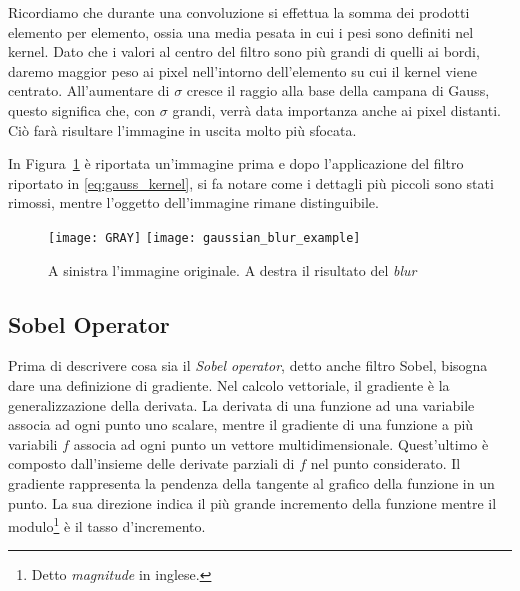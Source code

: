 Ricordiamo che durante una convoluzione si effettua la somma dei prodotti elemento per elemento, ossia una media pesata in cui i pesi sono definiti nel kernel.
Dato che i valori al centro del filtro sono più grandi di quelli ai bordi, daremo maggior peso ai pixel nell'intorno dell'elemento su cui il kernel viene centrato.
All'aumentare di $\sigma$ cresce il raggio alla base della campana di Gauss, questo significa che, con $\sigma$ grandi, verrà data importanza anche ai pixel distanti.
Ciò farà risultare l'immagine in uscita molto più sfocata.

In Figura~\ref{fig:gaussian_blur_example} è riportata un'immagine prima e dopo l'applicazione del filtro riportato in \ref{eq:gauss_kernel}, si fa notare come i dettagli più piccoli sono stati rimossi, mentre l'oggetto dell'immagine rimane distinguibile.

\begin{figure}[ht] %
  \begin{center}
    \texttt{[image: GRAY]}
    \texttt{[image: gaussian\_blur\_example]}
    \caption{A sinistra l'immagine originale. A destra il risultato del \textit{blur}}
    \label{fig:gaussian_blur_example}
  \end{center}
\end{figure}





\subsection {Sobel Operator}
Prima di descrivere cosa sia il \textit{Sobel operator}, detto anche filtro Sobel, bisogna dare una definizione di gradiente.
Nel calcolo vettoriale, il gradiente è la generalizzazione della derivata.
La derivata di una funzione ad una variabile associa ad ogni punto uno scalare, mentre il gradiente di una funzione a più variabili $f$ associa ad ogni punto un vettore multidimensionale.
Quest'ultimo è composto dall'insieme delle derivate parziali di $f$ nel punto considerato.
Il gradiente rappresenta la pendenza della tangente al grafico della funzione in un punto.
La sua direzione indica il più grande incremento della funzione mentre il modulo\footnote{Detto \textit{magnitude} in inglese.} è il tasso d'incremento.

